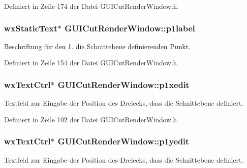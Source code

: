 Definiert in Zeile 174 der Datei G\-U\-I\-Cut\-Render\-Window.\-h.

\hypertarget{classGUICutRenderWindow_ac28961397f75c1d67dd1d983cda586f8}{
\subsubsection[{p1label}]{\setlength{\rightskip}{0pt plus 5cm}wx\-Static\-Text$\ast$ G\-U\-I\-Cut\-Render\-Window\-::p1label\hspace{0.3cm}{\ttfamily [private]}}}\label{classGUICutRenderWindow_ac28961397f75c1d67dd1d983cda586f8}
Beschriftung für den 1. die Schnittebene definierenden Punkt. 

Definiert in Zeile 154 der Datei G\-U\-I\-Cut\-Render\-Window.\-h.

\hypertarget{classGUICutRenderWindow_a509b5ca573c287e3863e952ec629fa7b}{
\subsubsection[{p1xedit}]{\setlength{\rightskip}{0pt plus 5cm}wx\-Text\-Ctrl$\ast$ G\-U\-I\-Cut\-Render\-Window\-::p1xedit\hspace{0.3cm}{\ttfamily [private]}}}\label{classGUICutRenderWindow_a509b5ca573c287e3863e952ec629fa7b}
Textfeld zur Eingabe der Position des Dreiecks, dass die Schnittebene definiert. 

Definiert in Zeile 102 der Datei G\-U\-I\-Cut\-Render\-Window.\-h.

\hypertarget{classGUICutRenderWindow_a93e837c15d8c6e7f420fd457c49024f2}{
\subsubsection[{p1yedit}]{\setlength{\rightskip}{0pt plus 5cm}wx\-Text\-Ctrl$\ast$ G\-U\-I\-Cut\-Render\-Window\-::p1yedit\hspace{0.3cm}{\ttfamily [private]}}}\label{classGUICutRenderWindow_a93e837c15d8c6e7f420fd457c49024f2}
Textfeld zur Eingabe der Position des Dreiecks, dass die Schnittebene definiert. 


